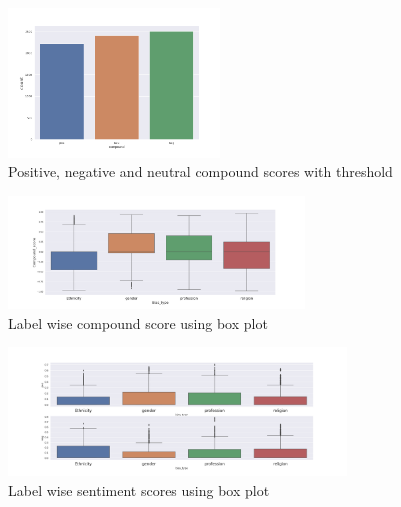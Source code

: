 \begin{figure}[h]
    \centering
    \includegraphics[width=0.5\textwidth]{thesis/figures/sentiment_scores.png}
    \caption{Positive, negative and neutral compound scores with threshold}
    \label{fig:sentiment_scores}
\end{figure}

\begin{figure}[h!]
    \centering
    \includegraphics[width=0.7\textwidth]{thesis/figures/sentiment_compound_boxplot.png}
    \caption{Label wise compound score using box plot}
    \label{fig:label_wise_compound_sentiment_scores}
\end{figure}

\begin{figure}[h!]
    \centering
    \includegraphics[width=0.8\textwidth]{thesis/figures/sentiment_scores_boxplot.png}
    \caption{Label wise sentiment scores using box plot}
    \label{fig:label_wise_sentiment}
\end{figure}

